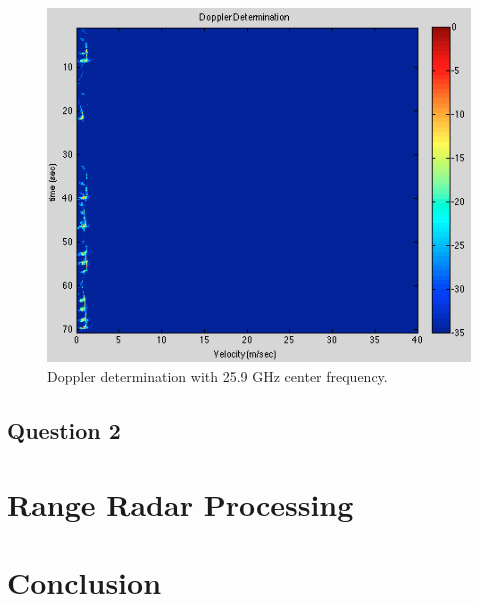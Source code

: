\documentclass{article}
\begin{document}
\begin{figure}[ht]
\begin{minipage}[b]{0.33\linewidth}
\label{fig:f_c_reduced}
\end{minipage}
\begin{minipage}[b]{0.33\linewidth}
\centering
\includegraphics[width=\textwidth]{Figures/f_c_increased.png}
\caption{Doppler determination with 25.9 GHz center frequency.}
\label{fig:f_c_increased}
\end{minipage}
\end{figure}

\subsection{Question 2}


\section{Range Radar Processing}

\section{Conclusion}
\end{document}
